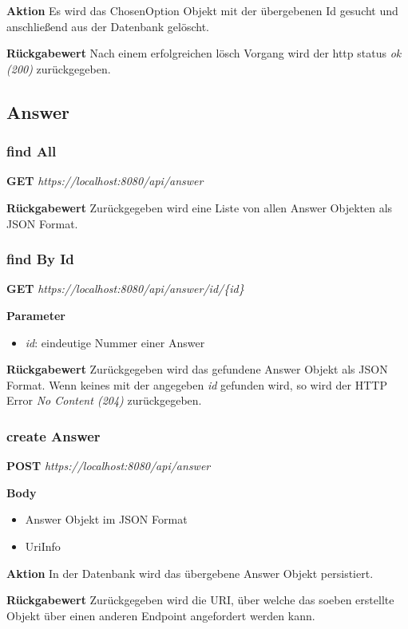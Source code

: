\textbf{Aktion}
Es wird das ChosenOption Objekt mit der übergebenen Id gesucht und anschließend
aus der Datenbank gelöscht.

\textbf{Rückgabewert}
Nach einem erfolgreichen lösch Vorgang wird der http status \emph{ok (200)} zurückgegeben.

\subsection{Answer}
\subsubsection{find All}
\textbf{GET} \emph{https://localhost:8080/api/answer}

\textbf{Rückgabewert}
Zurückgegeben wird eine Liste von allen Answer Objekten als JSON
Format.

\subsubsection{find By Id}
\textbf{GET} \emph{https://localhost:8080/api/answer/id/\{id\}}

\textbf{Parameter}
\begin{itemize}
    \item \emph{id}: eindeutige Nummer einer Answer
\end{itemize}

\textbf{Rückgabewert}
Zurückgegeben wird das gefundene Answer Objekt als JSON Format. Wenn keines mit der angegeben \emph{id} gefunden wird, so wird der
HTTP Error \emph{No Content (204)} zurückgegeben.

\subsubsection{create Answer}
\textbf{POST} \emph{https://localhost:8080/api/answer}

\textbf{Body}
\begin{itemize}
    \item Answer Objekt im JSON Format
    \item UriInfo
\end{itemize}

\textbf{Aktion}
In der Datenbank wird das übergebene Answer Objekt persistiert.

\textbf{Rückgabewert}
Zurückgegeben wird die URI, über welche das soeben erstellte Objekt über einen anderen Endpoint angefordert werden kann.

